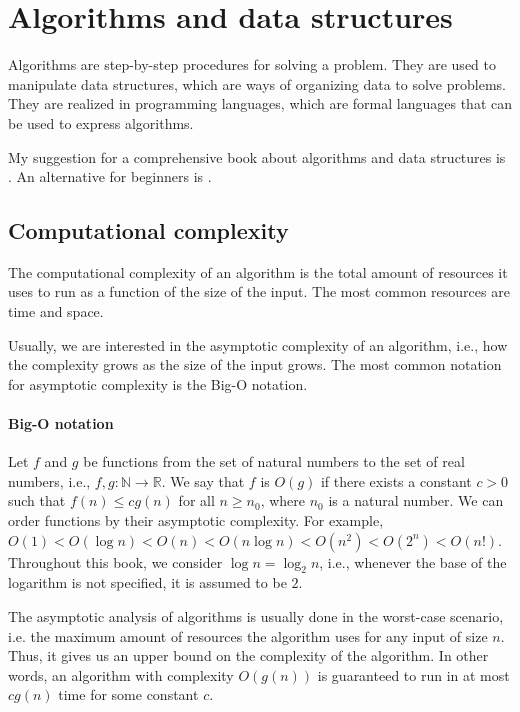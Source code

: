 {}
\clearpage

\section{Algorithms and data structures}

Algorithms are step-by-step procedures for solving a problem.  They are used to
manipulate data structures, which are ways of organizing data to solve problems.
They are realized in programming languages, which are formal languages that can be used
to express algorithms.

My suggestion for a comprehensive book about algorithms and data structures is
\textcite{Cormen2022}.  An alternative for beginners is
\textcite{Guttag2021}.

\subsection{Computational complexity}

The computational complexity of an algorithm is the total amount of resources it uses to
run as a function of the size of the input.  The most common resources are time and
space.

Usually, we are interested in the asymptotic complexity of an algorithm, i.e., how
the complexity grows as the size of the input grows.  The most common notation for
asymptotic complexity is the Big-O notation.

\paragraph{Big-O notation}  Let $f$ and $g$ be functions from the set of natural numbers
to the set of real numbers, i.e., $f, g : \mathbb{N} \rightarrow \mathbb{R}$.  We say that $f$ is
$O(g)$ if there exists a constant $c > 0$ such that $f(n) \leq c g(n)$ for all $n \geq
n_0$, where $n_0$ is a natural number.
We can order functions by their asymptotic complexity.  For example, $O(1) < O(\log n) <
O(n) < O(n \log n) < O(n^2) < O(2^n) < O(n!)$.  Throughout this book, we consider
$\log n = \log_2 n$, i.e., whenever the base of the logarithm is not specified, it is
assumed to be $2$.

The asymptotic analysis of algorithms is usually done in the worst-case scenario, i.e.
the maximum amount of resources the algorithm uses for any input of size $n$.  Thus,
it gives us an upper bound on the complexity of the algorithm.  In other words, an
algorithm with complexity $O(g(n))$ is guaranteed to run in at most $c g(n)$ time for some
constant $c$.

